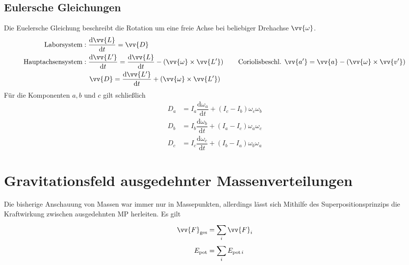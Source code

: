 \documentclass[a4paper,12pt]{article}
\begin{document}
\subsection{Eulersche Gleichungen}
Die Euelersche Gleichung beschreibt die Rotation um eine freie Achse bei beliebiger Drehachse $\vv{\omega }$.
\begin{align*} %
        \text{Laborsystem}&:\dfrac{\text{d}\vv{L}}{\text{d}t}=\vv{D}\\
        \text{Hauptachsensystem}&:\dfrac{\text{d}\vv{L'}}{\text{d}t}=\dfrac{\text{d}\vv{L}}{\text{d}t}-\left(\vv{\omega }\times \vv{L'}\right)\qquad \text{Coriolisbeschl. }\vv{a'}=\vv{a}-\left(\vv{\omega }\times \vv{v'}\right)\\
                                &\quad \vv{D}=\dfrac{\text{d}\vv{L'}}{\text{d}t}+\left(\vv{\omega }\times \vv{L'}\right)
\end{align*}
Für die Komponenten $a,b$ und $c$ gilt schließlich
\begin{align*} %
        D_a&=I_a\dfrac{\text{d}\omega _a}{\text{d}t}+\left(I_c-I_b\right)\omega _c\omega _b\\
        D_b&=I_b\dfrac{\text{d}\omega _b}{\text{d}t}+\left(I_a-I_c\right)\omega _a\omega _c\\
        D_c&=I_c\dfrac{\text{d}\omega _c}{\text{d}t}+\left(I_b-I_a\right)\omega _b\omega _a
\end{align*}

\section{Gravitationsfeld ausgedehnter Massenverteilungen}
Die bisherige Anschauung von Massen war immer nur in Massepunkten, allerdings lässt sich Mithilfe des Superpositionsprinzips die Kraftwirkung zwischen ausgedehnten MP herleiten. Es gilt
\begin{align*}
        \vv{F}_{\text{ges}}&=\sum_{i}^{}\vv{F}_i\\
        E_{\text{pot}}&=\sum_{i}^{}E_{\text{pot}\,i}
\end{align*}
\end{document}
